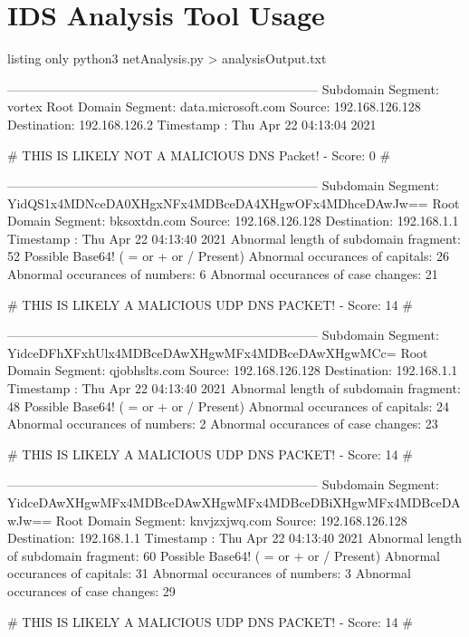 \section{IDS Analysis Tool Usage}

\begin{tcblisting}{listing only}
python3 netAnalysis.py > analysisOutput.txt

--------------------------------------------------------------------------
Subdomain Segment:  vortex
Root Domain Segment:  data.microsoft.com
Source:  192.168.126.128
Destination:  192.168.126.2
Timestamp : Thu Apr 22 04:13:04 2021


   # THIS IS LIKELY NOT A MALICIOUS DNS Packet! - Score:  0 #

--------------------------------------------------------------------------
Subdomain Segment:  YidQS1x4MDNceDA0XHgxNFx4MDBceDA4XHgwOFx4MDhceDAwJw==
Root Domain Segment:  bksoxtdn.com
Source:  192.168.126.128
Destination:  192.168.1.1
Timestamp : Thu Apr 22 04:13:40 2021
   Abnormal length of subdomain fragment: 52   Possible Base64! ( = or + or / Present)    Abnormal occurances of capitals: 26   Abnormal occurances of numbers: 6   Abnormal occurances of case changes: 21

   # THIS IS LIKELY A MALICIOUS UDP DNS PACKET! - Score:  14 #

--------------------------------------------------------------------------
Subdomain Segment:  YidceDFhXFxhUlx4MDBceDAwXHgwMFx4MDBceDAwXHgwMCc=
Root Domain Segment:  qjobhslts.com
Source:  192.168.126.128
Destination:  192.168.1.1
Timestamp : Thu Apr 22 04:13:40 2021
   Abnormal length of subdomain fragment: 48   Possible Base64! ( = or + or / Present)    Abnormal occurances of capitals: 24   Abnormal occurances of numbers: 2   Abnormal occurances of case changes: 23

   # THIS IS LIKELY A MALICIOUS UDP DNS PACKET! - Score:  14 #

--------------------------------------------------------------------------
Subdomain Segment:  YidceDAwXHgwMFx4MDBceDAwXHgwMFx4MDBceDBiXHgwMFx4MDBceDAwJw==
Root Domain Segment:  knvjzxjwq.com
Source:  192.168.126.128
Destination:  192.168.1.1
Timestamp : Thu Apr 22 04:13:40 2021
   Abnormal length of subdomain fragment: 60   Possible Base64! ( = or + or / Present)    Abnormal occurances of capitals: 31   Abnormal occurances of numbers: 3   Abnormal occurances of case changes: 29

   # THIS IS LIKELY A MALICIOUS UDP DNS PACKET! - Score:  14 #


\end{tcblisting}
